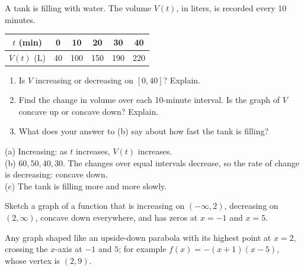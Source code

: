 \begin{exo}{}
A tank is filling with water. The volume $V(t)$, in liters, is recorded every 10 minutes.
\begin{center}\begin{tabular}{c|ccccc}$t$ (min)&0&10&20&30&40\\\hline$V(t)$ (L)&40&100&150&190&220\end{tabular}\end{center}
\begin{enumerate}[label=(\alph*)]
\item Is $V$ increasing or decreasing on $[0,40]$? Explain.
\item Find the change in volume over each 10-minute interval. Is the graph of $V$ concave up or concave down? Explain.
\item What does your answer to (b) say about how fast the tank is filling?
\end{enumerate}
\begin{solution}
(a) Increasing: as $t$ increases, $V(t)$ increases.\\
(b) $60, 50, 40, 30$. The changes over equal intervals decrease, so the rate of change is decreasing: concave down.\\
(c) The tank is filling more and more slowly.
\end{solution}
\end{exo}
\begin{exo}{}
Sketch a graph of a function that is increasing on $(-\infty,2)$, decreasing on $(2,\infty)$, concave down everywhere, and has zeros at $x=-1$ and $x=5$.
\begin{solution}
Any graph shaped like an upside-down parabola with its highest point at $x=2$, crossing the $x$-axis at $-1$ and $5$; for example $f(x)=-(x+1)(x-5)$, whose vertex is $(2,9)$.
\end{solution}
\end{exo}

